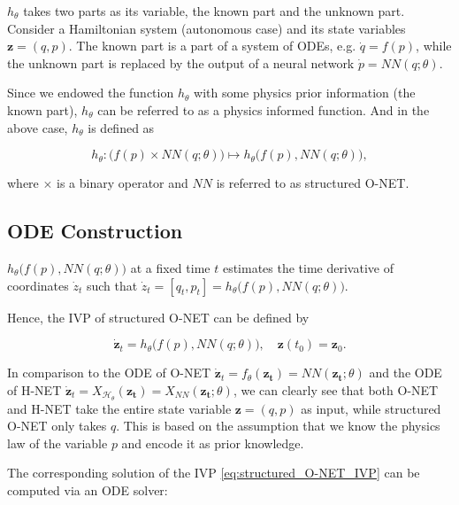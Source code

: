 \documentclass[
	parskip, 			   %
	twoside, 			   %
	DIV=14, 			   %
	BCOR=15.0mm, 		   %
	headsepline, 		   %
	open=right, 		   %
	captions=tableheading, %
	bibliography=totoc,    %
	numbers=noenddot       %
]{scrreprt}
\begin{document}
$h_{\theta}$ takes two parts as its variable, the known part and the unknown part. Consider a Hamiltonian system (autonomous case) and its state variables $\mathbf{z}=(q, p)$. The known part is a part of a system of ODEs, e.g. $\dot{q} = f(p)$, while the unknown part is replaced by the output of a neural network $\dot{p} = NN(q; \theta)$. 

Since we endowed the function $h_{\theta}$ with some physics prior information (the known part), $h_{\theta}$ can be referred to as a physics informed function. And in the above case, $h_{\theta}$ is defined as

\begin{equation}
    \label{eq:physics_informed_function}
    h_{\theta} : \big( f(p) \times NN(q; \theta) \big) \longmapsto h_{\theta} \big(f(p), NN(q; \theta) \big),
\end{equation}

where $\times$ is a binary operator and $NN$ is referred to as structured O-NET.

\subsection{ODE Construction}

$h_{\theta} \big(f(p), NN(q; \theta) \big)$ at a fixed time $t$ estimates the time derivative of coordinates $\dot z_{t}$ such that $\dot z_{t} = [q_{t}, p_{t}] = h_{\theta} \big(f(p), NN(q; \theta) \big)$.

Hence, the IVP of structured O-NET can be defined by

\begin{equation}
    \label{eq:structured_O-NET_IVP}
    \dot{\mathbf{z}}_t = h_{\theta} \big(f(p), NN(q; \theta) \big), \quad \mathbf{z}(t_{0}) = \mathbf{z}_{0}.
\end{equation}

In comparison to the ODE of O-NET $\dot{\mathbf{z}}_t = f_{\theta}(\mathbf{z_t}) = NN(\mathbf{z_t}; \theta)$ and the ODE of H-NET $\dot{\mathbf{z}}_t = X_{\mathcal{H}_{\theta}}(\mathbf{z_t}) = X_{NN}(\mathbf{z_t}; \theta)$, we can clearly see that both O-NET and H-NET take the entire state variable $\mathbf{z}=(q, p)$ as input, while structured O-NET only takes $q$. This is based on the assumption that we know the physics law of the variable $p$ and encode it as prior knowledge.

The corresponding solution of the IVP \ref{eq:structured_O-NET_IVP} can be computed via an ODE solver:
\end{document}
